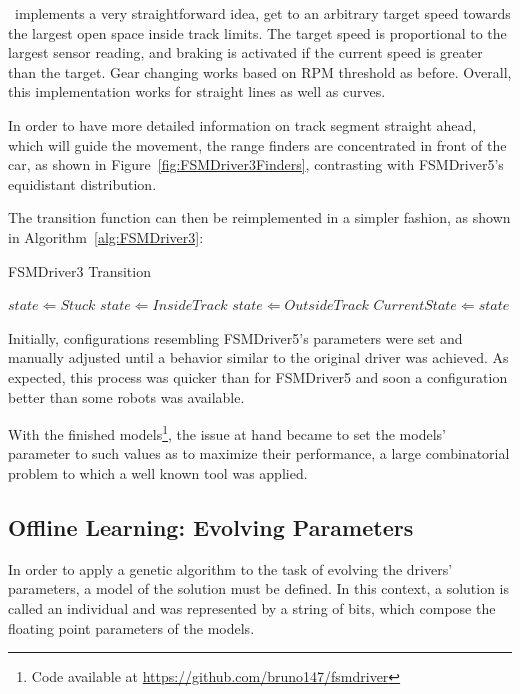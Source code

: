 \IT~implements a very straightforward idea, get to an arbitrary target speed towards the largest open space inside track limits. The target speed is proportional to the largest sensor reading, and braking is activated if the current speed is greater than the target. Gear changing works based on RPM threshold as before. Overall, this implementation works for straight lines as well as curves.

In order to have more detailed information on track segment straight ahead, which will guide the movement, the range finders are concentrated in front of the car, as shown in Figure~\ref{fig:FSMDriver3Finders}, contrasting with FSMDriver5's equidistant distribution.


The transition function can then be reimplemented in a simpler fashion, as shown in Algorithm~\ref{alg:FSMDriver3}:

\begin{algorithm}[h]%
\caption{FSMDriver3 Transition}%
\label{alg:FSMDriver3}%
\begin{algorithmic}
        \STATE $state \Leftarrow Stuck$
    \ELSE
            \STATE $state \Leftarrow Inside Track$
        \ELSE
            \STATE $state \Leftarrow Outside Track$
        \ENDIF
    \ENDIF
        \STATE $Current State \Leftarrow state$
    \ENDIF
\end{algorithmic}
\end{algorithm}

Initially, configurations resembling FSMDriver5's parameters were set and manually adjusted until a behavior similar to the original driver was achieved. As expected, this process was quicker than for FSMDriver5 and soon a configuration better than some robots was available.

With the finished models\footnote{Code available at \url{https://github.com/bruno147/fsmdriver}}, the issue at hand became to set the models' parameter to such values as to maximize their performance, a large combinatorial problem to which a well known tool was applied.

\subsection{Offline Learning: Evolving Parameters}%
In order to apply a genetic algorithm to the task of evolving the drivers' parameters, a model of the solution must be defined. In this context, a solution is called an individual and was represented by a string of bits, which compose the floating point parameters of the models.


